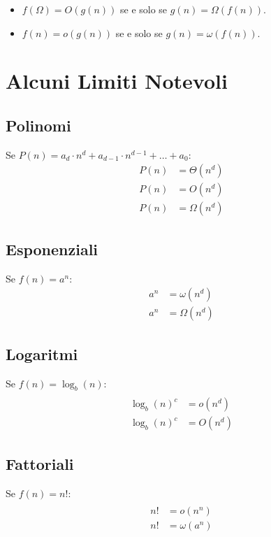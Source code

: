 \documentclass{article}
\begin{document}
\begin{itemize}
    \item $f(\Omega) = O(g(n))$ se e solo se $g(n) = \Omega(f(n))$.
    \item $f(n) = o(g(n))$ se e solo se $g(n) = \omega(f(n))$.
\end{itemize}

\section{Alcuni Limiti Notevoli}

\subsection{Polinomi}
Se $P(n) = a_d \cdot n^d + a_{d-1} \cdot n^{d-1} + \ldots + a_0$: \\
\begin{align}
    P(n) &= \Theta(n^d) \\
    P(n) &= O(n^d) \\
    P(n) &= \Omega(n^d)
\end{align}

\subsection{Esponenziali}
Se $f(n) = a^n$:\\
\begin{align}
    a^n &= \omega(n^d) \\
    a^n &= \Omega(n^d)
\end{align}

\subsection{Logaritmi}
Se $f(n) = \log_b(n)$:
\begin{align} \\
    \log_b(n)^c &= o(n^d) \\
    \log_b(n)^c &= O(n^d)
\end{align}

\subsection{Fattoriali}
Se $f(n) = n!$:
\begin{align} \\
    n! &= o(n^n) \\
    n! &= \omega(a^n)
\end{align}
\end{document}
